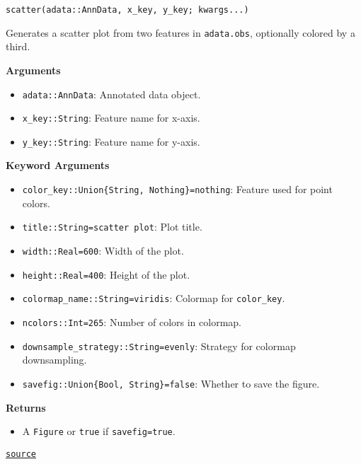 \documentclass[oneside]{memoir}
\begin{document}
\begin{adjustwidth}{2em}{0pt}


\begin{verbatim}
scatter(adata::AnnData, x_key, y_key; kwargs...)
\end{verbatim}

Generates a scatter plot from two features in \texttt{adata.obs}, optionally colored by a third.

\textbf{Arguments}

\begin{itemize}
\item \texttt{adata::AnnData}: Annotated data object.


\item \texttt{x\_key::String}: Feature name for x-axis.


\item \texttt{y\_key::String}: Feature name for y-axis.

\end{itemize}
\textbf{Keyword Arguments}

\begin{itemize}
\item \texttt{color\_key::Union\{String, Nothing\}=nothing}: Feature used for point colors.


\item \texttt{title::String={\textquotedbl}scatter plot{\textquotedbl}}: Plot title.


\item \texttt{width::Real=600}: Width of the plot.


\item \texttt{height::Real=400}: Height of the plot.


\item \texttt{colormap\_name::String={\textquotedbl}viridis{\textquotedbl}}: Colormap for \texttt{color\_key}.


\item \texttt{ncolors::Int=265}: Number of colors in colormap.


\item \texttt{downsample\_strategy::String={\textquotedbl}evenly{\textquotedbl}}: Strategy for colormap downsampling.


\item \texttt{savefig::Union\{Bool, String\}=false}: Whether to save the figure.

\end{itemize}
\textbf{Returns}

\begin{itemize}
\item A \texttt{Figure} or \texttt{true} if \texttt{savefig=true}.

\end{itemize}


\href{https://github.com/zehua0417/Juscan.jl/blob/393ad1b827b678ea98a738f92af658ee9ed9a403/src/plots/plots.jl#L162-L185}{\texttt{source}}


\end{adjustwidth}
\end{document}
